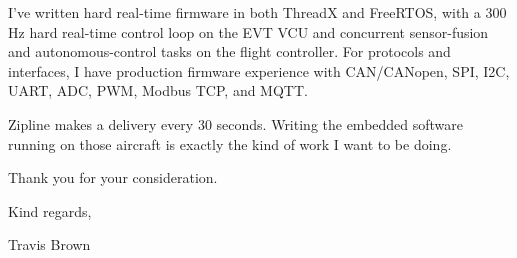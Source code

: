 \documentclass[11pt]{article}
\begin{document}
I've written hard real-time firmware in both ThreadX and FreeRTOS, with a 300\,Hz hard
real-time control loop on the EVT VCU and concurrent sensor-fusion and autonomous-control
tasks on the flight controller. For protocols and interfaces, I have production firmware
experience with CAN/CANopen, SPI, I2C, UART, ADC, PWM, Modbus TCP, and MQTT.

Zipline makes a delivery every 30 seconds. Writing the embedded software running on those
aircraft is exactly the kind of work I want to be doing.

Thank you for your consideration.

\vspace{16pt}
Kind regards,

\vspace{20pt}
Travis Brown
\end{document}
